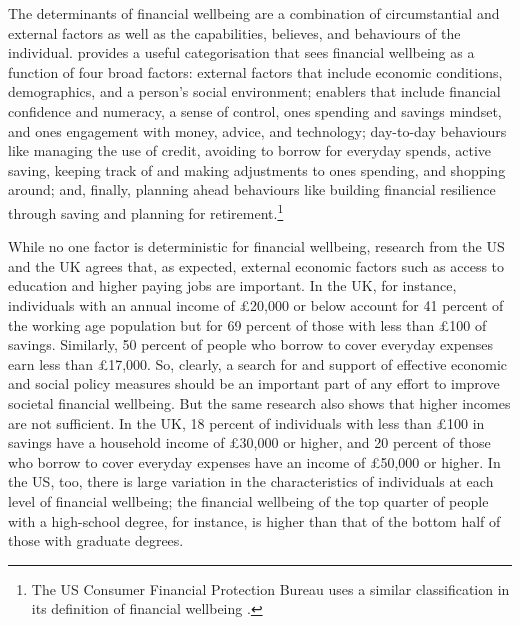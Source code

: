 The determinants of financial wellbeing are a combination of circumstantial and
external factors as well as the capabilities, believes, and behaviours of the
individual. \citet{mps2018building} provides a useful categorisation that sees
financial wellbeing as a function of four broad factors: external factors that
include economic conditions, demographics, and a person's social environment;
enablers that include financial confidence and numeracy, a sense of control,
ones spending and savings mindset, and ones engagement with money, advice, and
technology; day-to-day behaviours like managing the use of credit, avoiding to
borrow for everyday spends, active saving, keeping track of and making
adjustments to ones spending, and shopping around; and, finally, planning ahead
behaviours like building financial resilience through saving and planning for
retirement.\footnote{The US Consumer Financial Protection Bureau uses a similar
    classification in its definition of financial wellbeing
\citep{cfpb2015financial}.}

While no one factor is deterministic for financial wellbeing, research from the
US \citep{cfpb2017financial} and the UK \citep{mps2018building} agrees that, as
expected, external economic factors such as access to education and higher
paying jobs are important. In the UK, for instance, individuals with an annual
income of \pounds20,000 or below account for 41 percent of the working age
population but for 69 percent of those with less than \pounds100 of savings.
Similarly, 50 percent of people who borrow to cover everyday expenses earn less
than \pounds17,000. So, clearly, a search for and support of effective economic
and social policy measures should be an important part of any effort to improve
societal financial wellbeing. But the same research also shows that higher
incomes are not sufficient. In the UK, 18 percent of individuals with less than
\pounds 100 in savings have a household income of \pounds30,000 or higher, and
20 percent of those who borrow to cover everyday expenses have an income of
\pounds50,000 or higher. In the US, too, there is large variation in the
characteristics of individuals at each level of financial wellbeing; the
financial wellbeing of the top quarter of people with a high-school degree, for
instance, is higher than that of the bottom half of those with graduate
degrees.

